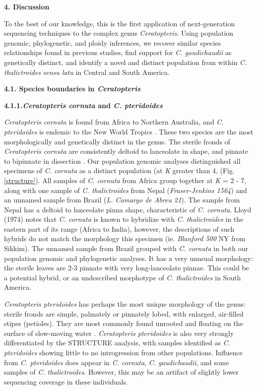 \documentclass[12pt]{article}
\begin{document}
\begin{flushleft}
\vspace{1cm}

{\large\textbf{4. Discussion}}

To the best of our knowledge, this is the first application of next-generation sequencing techniques to the complex genus \textit{Ceratopteris}. Using population genomic, phylogenetic, and ploidy inferences, we recover similar species relationships found in previous studies, find support for \textit{C. gaudichaudii} as genetically distinct, and identify a novel and distinct population from within \textit{C. thalictroides} \textit{sensu latu} in Central and South America.

\textbf{4.1. Species boundaries in \textit{Ceratopteris}} 

\textbf{4.1.1.\textit{Ceratopteris cornuta} and \textit{C. pteridoides}}

\textit{Ceratopteris cornuta} is found from Africa to Northern Australia, and \textit{C. pteridoides} is endemic to the New World Tropics \autocite{LloydTax1974}. These two species are the most morphologically and genetically distinct in the genus. The sterile fronds of \textit{Ceratopteris cornuta} are consistently deltoid to lanceolate in shape, and pinnate to bipinnate in dissection \autocite{LloydTax1974}. Our population genomic analyses distinguished all specimens of \textit{C. cornuta} as a distinct population (at \textit{K} greater than 4, (Fig. \ref{structure}). All samples of \textit{C. cornuta} from Africa group together at \textit{K} = 2 - 7, along with one sample of \textit{C. thalictroides} from Nepal (\textit{Fraser-Jenkins 1564}) and an unnamed sample from Brazil (\textit{L. Camargo de Abreu 21}). The sample from Nepal has a deltoid to lanceolate pinna shape, characteristic of \textit{C. cornuta}. Lloyd (1974) notes that \textit{C. cornuta} is known to hybridize with \textit{C. thalictroides} in the eastern part of its range (Africa to India), however, the descriptions of such hybrids do not match the morphology this specimen (ie. \textit{Blanford 500} NY from Sikkim). The unnamed sample from Brazil grouped with \textit{C. cornuta} in both our population genomic and phylogenetic analyses. It has a very unusual morphology: the sterile leaves are 2-3 pinnate with very long-lanceolate pinnae. This could be a potential hybrid, or an undescribed morphotype of \textit{C. thalictroides} in South America.

\textit{Ceratopteris pteridoides} has perhaps the most unique morphology of the genus: sterile fronds are simple, palmately or pinnately lobed, with enlarged, air-filled stipes (petioles). They are most commonly found unrooted and floating on the surface of slow-moving water \autocite{LloydTax1974}. \textit{Ceratopteris pteridoides} is also very strongly differentiated by the {\small{STRUCTURE}} analysis, with samples identified as \textit{C. pteridoides} showing little to no introgression from other populations. Influence from \textit{C. pteridoides} does appear in \textit{C. cornuta}, \textit{C. gaudichaudii}, and some samples of \textit{C. thalictroides}. However, this may be an artifact of slightly lower sequencing coverage in these individuals.


\end{flushleft}
\end{document}
